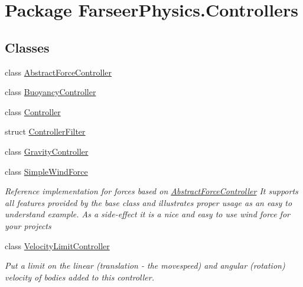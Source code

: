 \hypertarget{namespace_farseer_physics_1_1_controllers}{\section{Package Farseer\+Physics.\+Controllers}
\label{namespace_farseer_physics_1_1_controllers}
}
\subsection*{Classes}
\begin{DoxyCompactItemize}
\item 
class \hyperlink{class_farseer_physics_1_1_controllers_1_1_abstract_force_controller}{Abstract\+Force\+Controller}
\item 
class \hyperlink{class_farseer_physics_1_1_controllers_1_1_buoyancy_controller}{Buoyancy\+Controller}
\item 
class \hyperlink{class_farseer_physics_1_1_controllers_1_1_controller}{Controller}
\item 
struct \hyperlink{struct_farseer_physics_1_1_controllers_1_1_controller_filter}{Controller\+Filter}
\item 
class \hyperlink{class_farseer_physics_1_1_controllers_1_1_gravity_controller}{Gravity\+Controller}
\item 
class \hyperlink{class_farseer_physics_1_1_controllers_1_1_simple_wind_force}{Simple\+Wind\+Force}
\begin{DoxyCompactList}\small\item\em Reference implementation for forces based on \hyperlink{class_farseer_physics_1_1_controllers_1_1_abstract_force_controller}{Abstract\+Force\+Controller} It supports all features provided by the base class and illustrates proper usage as an easy to understand example. As a side-\/effect it is a nice and easy to use wind force for your projects \end{DoxyCompactList}\item 
class \hyperlink{class_farseer_physics_1_1_controllers_1_1_velocity_limit_controller}{Velocity\+Limit\+Controller}
\begin{DoxyCompactList}\small\item\em Put a limit on the linear (translation -\/ the movespeed) and angular (rotation) velocity of bodies added to this controller. \end{DoxyCompactList}\end{DoxyCompactItemize}
